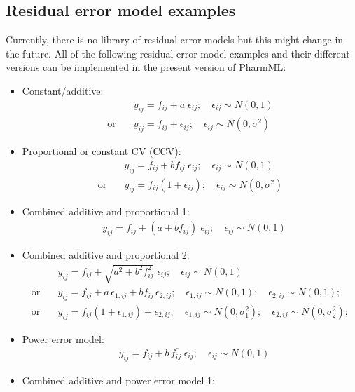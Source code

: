 \subsection{Residual error model examples}
\label{subsec:modelExamples}
Currently, there is no library of residual error models but this might change in the future. All of the following residual error model examples and their different versions can be implemented in the present version of PharmML:
\begin{itemize}
\item
Constant/additive:
\begin{align*}
& y_{ij} = f_{ij} + a \; \epsilon_{ij}; \quad \epsilon_{ij} \sim N(0,1)  \\
\text{or} \quad & y_{ij} = f_{ij} + \epsilon_{ij}; \quad \epsilon_{ij} \sim N(0,\sigma^2)
\end{align*}
\item
Proportional or constant CV (CCV):
\begin{align*}
&y_{ij} =  f_{ij} + bf_{ij} \; \epsilon_{ij}; \quad \epsilon_{ij} \sim N(0,1)  \\
\text{or} \quad & y_{ij} =  f_{ij}(1+\epsilon_{ij}); \quad \epsilon_{ij} \sim N(0,\sigma^2)
\end{align*}
\item
Combined additive and proportional 1:
\begin{align*}
& y_{ij} =  f_{ij} + (a + bf_{ij}) \; \epsilon_{ij}; \quad \epsilon_{ij} \sim N(0,1)
\end{align*}
\item
Combined additive and proportional 2:
\begin{align*}
& y_{ij} =  f_{ij} + \sqrt{a^2 + b^2f_{ij}^2} \; \epsilon_{ij}; \quad \epsilon_{ij} \sim N(0,1)  \\
\text{or}  \quad & y_{ij} =  f_{ij} +  a\, \epsilon_{1,ij} + b f_{ij}\, \epsilon_{2,ij}; \quad \epsilon_{1,ij} \sim N(0,1); \quad \epsilon_{2,ij} \sim N(0,1);   \\
\text{or}  \quad & y_{ij} =  f_{ij} (1 + \epsilon_{1,ij}) + \epsilon_{2,ij}; \quad \epsilon_{1,ij} \sim N(0,\sigma_1^2); \quad \epsilon_{2,ij} \sim N(0,\sigma_2^2);
\end{align*}
\item
Power error model:
\begin{align*}
& y_{ij} = f_{ij} + b\,f_{ij}^c \; \epsilon_{ij}; \quad \epsilon_{ij} \sim N(0,1)
\end{align*}
\item
Combined additive and power error model 1:

\end{itemize}
